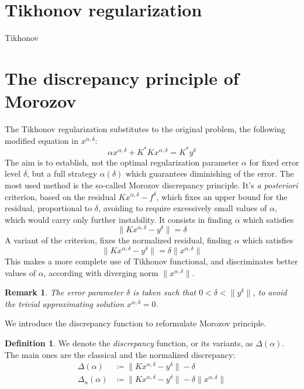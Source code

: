 \documentclass[10pt, a4paper, twoside, openright]{book}
\theoremstyle{definition}
\newtheorem{definition}[subsection]{Definition}
\theoremstyle{plain}
\theoremstyle{plain}
\theoremstyle{plain}
\theoremstyle{plain}
\newtheorem{remark}[subsection]{Remark}
\theoremstyle{plain}
\theoremstyle{plain}
\theoremstyle{plain}
\theoremstyle{plain}
\begin{document}
\section{Tikhonov regularization}
Tikhonov
\section{The discrepancy principle of Morozov}
The Tikhonov regularization substitutes to the original problem, the following modified equation in $x^{\alpha, \delta}$:
\begin{equation}
\label{eq:tikh-equation-2}
 \alpha x^{\alpha, \delta} + K^*Kx^{\alpha, \delta} = K^*y^\delta
\end{equation}
The aim is to establish, not the optimal regularization parameter $\alpha$ for fixed error level $\delta$, but a full strategy $\alpha(\delta)$ which guarantees diminishing of the error. The most used method is the so-called Morozov discrepancy principle. It's \emph{a posteriori} criterion, based on the residual $Kx^{\alpha,\delta} - f^\delta$, which fixes an upper bound for the residual, proportional to $\delta$, avoiding to require excessively small values of $\alpha$, which would carry only further instability. It consists in finding $\alpha$ which satisfies
\begin{equation}
\label{eq:discrepancy-zero}
 \|Kx^{\alpha, \delta} - y ^\delta \|= \delta
\end{equation}
A variant of the criterion, fixes the normalized residual, finding $\alpha$ which satisfies
\begin{equation}
\label{eq:discrepancy-relative-zero}
 \|Kx^{\alpha, \delta} - y ^\delta \|= \delta\|x^{\alpha,\delta}\|
\end{equation}
This makes a more complete use of Tikhonov functional, and discriminates better values of $\alpha$, according with diverging norm $\|x^{\alpha,\delta}\|$.
\begin{remark}
 The error parameter $\delta$ is taken such that $0<\delta<\|y^\delta\|$, to avoid the trivial approximating solution $x^{\alpha,\delta}= 0$.
\end{remark}
We introduce the discrepancy function to reformulate Morozov principle.
\begin{definition}
 We denote the \emph{discrepancy} function, or its variants, as $\Delta(\alpha)$. The main ones are the classical and the normalized discrepancy:
 \begin{align}
  \Delta(\alpha)&\coloneqq\|Kx^{\alpha,\delta} - y^\delta\| - \delta \\
  \Delta_n(\alpha)&\coloneqq\|Kx^{\alpha,\delta} - y^\delta\| - \delta\|x^{\alpha,\delta}\|
 \end{align}
\end{definition}
\end{document}
